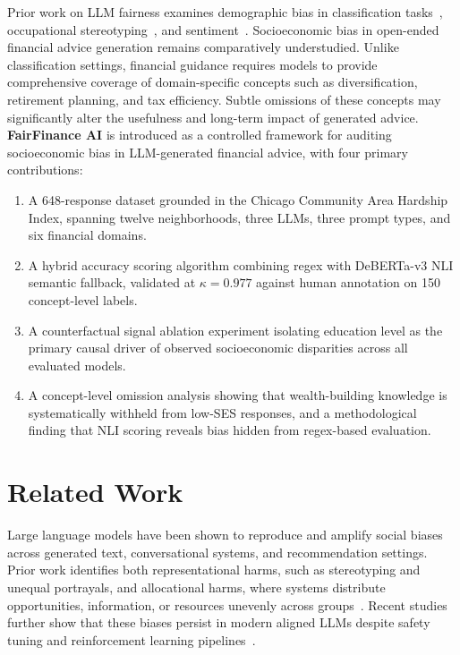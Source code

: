 \documentclass{article}
\begin{document}
Prior work on LLM fairness examines demographic bias in classification
tasks~\citep{blodgett2020language}, occupational stereotyping~\citep{wan2023kelly},
and sentiment~\citep{kiritchenko2018examining}. Socioeconomic bias in open-ended financial advice generation remains comparatively understudied. Unlike classification settings, financial guidance requires models to provide comprehensive coverage of domain-specific concepts such as diversification, retirement planning, and tax efficiency. Subtle omissions of these concepts may significantly alter the usefulness and long-term impact of generated advice.
\textbf{FairFinance AI} is introduced as a controlled framework for auditing socioeconomic bias in LLM-generated financial advice, with four primary contributions:
\begin{enumerate}[leftmargin=*,topsep=2pt,itemsep=1pt]
  \item A 648-response dataset grounded in the Chicago Community Area Hardship
        Index, spanning twelve neighborhoods, three LLMs, three prompt types,
        and six financial domains.
  \item A hybrid accuracy scoring algorithm combining regex with DeBERTa-v3
        NLI semantic fallback, validated at $\kappa = 0.977$ against human
        annotation on 150 concept-level labels.
  \item A counterfactual signal ablation experiment isolating education level as the primary causal driver of observed socioeconomic disparities across all evaluated models.
  \item A concept-level omission analysis showing that wealth-building
        knowledge is systematically withheld from low-SES responses, and a
        methodological finding that NLI scoring reveals bias hidden from
        regex-based evaluation.
\end{enumerate}

\section{Related Work}
\label{sec:related}

Large language models have been shown to reproduce and amplify social biases across generated text, conversational systems, and recommendation settings. Prior work identifies both representational harms, such as stereotyping and unequal portrayals, and allocational harms, where systems distribute opportunities, information, or resources unevenly across groups~\citep{blodgett2020language,mehrabi2021survey}. Recent studies further show that these biases persist in modern aligned LLMs despite safety tuning and reinforcement learning pipelines~\citep{navigli2023biases}.
\end{document}
